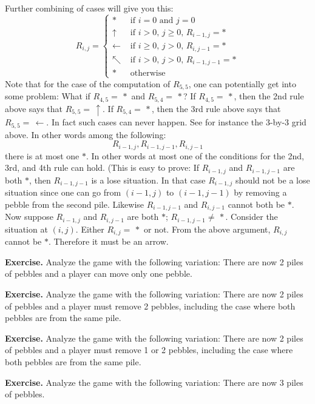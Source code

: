 Further combining of cases will give you this:
\[
R_{i,j} =
\begin{cases}
*           & \text{ if $i = 0$ and $j = 0$} \\
\uparrow    & \text{ if $i>0$, $j \geq 0$, $R_{i-1,j} = *$} \\
\leftarrow  & \text{ if $i \geq 0$, $j>0$, $R_{i,j-1} = *$} \\
\nwarrow    & \text{ if $i>0$, $j>0$, $R_{i-1,j-1} = *$} \\
*           & \text{ otherwise}
\end{cases}
\]
Note that for the case of the computation of $R_{5,5}$, one
can potentially get into some problem: 
What if $R_{4,5} = \, *$ and $R_{5,4} = \, *$?
If $R_{4,5} = \, *$, then the 2nd rule above says that $R_{5,5} = \, \uparrow$.
If $R_{5,4} = \, *$, then the 3rd rule above says that 
$R_{5,5} = \, \leftarrow$.
In fact such cases can never happen.
See for instance the 3-by-3 grid above.
In other words among the following:
\[
R_{i-1,j}, R_{i-1, j-1}, R_{i, j-1}
\]
there is at most one $*$.
In other words at most one of the conditions for the 2nd, 3rd, and 4th rule
can hold.
(This is easy to prove: 
If $R_{i-1,j}$ and $R_{i-1,j-1}$ are both $*$,
then $R_{i-1,j-1}$ is a lose situation. In that case $R_{i-1,j}$
should not be a lose situation since one can go from $(i-1, j)$ to $(i-1,j-1)$
by removing a pebble from the second pile.
Likewise $R_{i-1,j-1}$ and $R_{i, j-1}$ cannot both be $*$.
Now suppose $R_{i-1,j}$ and $R_{i, j-1}$ are both $*$;
$R_{i-1,j-1} \neq \, *$.
Consider the situation at $(i,j)$.
Either $R_{i,j} = \, *$ or not.
From the above argument, $R_{i,j}$ cannot be $*$.
Therefore it must be an arrow.


{\bf Exercise.}
Analyze the game with the following variation: There are now 2 piles of
pebbles and a player can move only one pebble.

{\bf Exercise.}
Analyze the game with the following variation: There are now 2 piles of
pebbles and a player must remove 2 pebbles, including the case where
both pebbles are from the same pile.

{\bf Exercise.}
Analyze the game with the following variation: There are now 2 piles of
pebbles and a player must remove 1 or 2 pebbles, including the case where
both pebbles are from the same pile.

{\bf Exercise.}
Analyze the game with the following variation: There are now 3 piles of
pebbles.

\newpage

